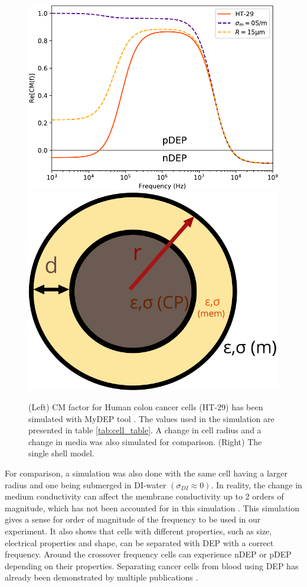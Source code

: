 \documentclass[final]{jyflluk}
\begin{document}
\begin{figure}[h]%
    \centering
    \includegraphics[width=.70\linewidth]{images/plot_DEP2.pdf}\quad\includegraphics[width=.27\linewidth]{images/single_shell.pdf}
    \qquad
    \begin{minipage}{1.2in}
    \end{minipage}%
    \caption{(Left) CM factor for Human colon cancer cells (HT-29) has been simulated with MyDEP tool \cite{cottet_mydep_2019}. The values used in the simulation are presented in table \ref{tab:cell_table}. A change in cell radius and a change in media was also simulated for comparison. (Right) The single shell model.}%
    \label{fig:single_shell}%
\end{figure}


For comparison, a simulation was also done with the same cell having a larger radius and one being submerged in DI-water $(\sigma_{DI}\approx0)$. In reality, the change in medium conductivity can affect the membrane conductivity up to 2 orders of magnitude, which has not been accounted for in this simulation \cite{wu_dielectrophoretic_2012}. This simulation gives a sense for order of magnitude of the frequency to be used in our experiment. It also shows that cells with different properties, such as size, electrical properties and shape, can be separated with DEP with a correct frequency. Around the crossover frequency cells can experience nDEP or pDEP depending on their properties. Separating cancer cells from blood using DEP has already been demonstrated by multiple publications \cite{becker_separation_1995,huang_enrichment_2013,kang_continuous_2006, ivory_direct_2011}.
\end{document}
